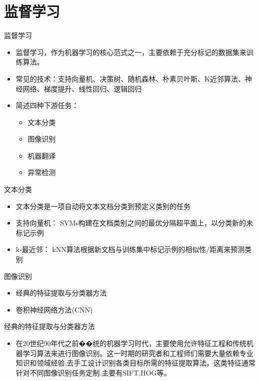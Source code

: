 \documentclass[UTF8,AutoFakeBold,AutoFakeSlant]{beamer}
\begin{document}
\section{监督学习}
\begin{frame}{监督学习}
    \begin{itemize}
        \item 监督学习，作为机器学习的核心范式之一，主要依赖于充分标记的数据集来训练算法。
        \item 常见的技术：支持向量机、决策树、随机森林、朴素贝叶斯、K近邻算法、神经网络、梯度提升、线性回归、逻辑回归
        \item 简述四种下游任务：
              \begin{itemize}
                  \item 文本分类
                  \item 图像识别
                  \item 机器翻译
                  \item 异常检测
              \end{itemize}
    \end{itemize}
\end{frame}

\begin{frame}{文本分类}
    \small
    \begin{itemize}
        \item 文本分类是一项自动将文本文档分类到预定义类别的任务
        \item 支持向量机： SVMs构建在文档类别之间的最优分隔超平面上，以分类新的未标记示例
        \item k-最近邻： kNN算法根据新文档与训练集中标记示例的相似性/距离来预测类别
    \end{itemize}
\end{frame}

\begin{frame}{图像识别}
    \begin{itemize}
        \item 经典的特征提取与分类器方法
        \item 卷积神经网络方法(CNN)

    \end{itemize}
\end{frame}

\begin{frame}{经典的特征提取与分类器方法}
    \begin{itemize}
        \item 在20世纪90年代之前��统的机器学习时代，主要使用允许特征工程和传统机器学习算法来进行图像识别。这一时期的研究者和工程师们需要大量依赖专业知识和领域经验,去手工设计识别各类目标所需的特征提取算法。这类特征通常针对不同图像识别任务定制,主要有SIFT,HOG等。
    \end{itemize}
\end{frame}
\end{document}
